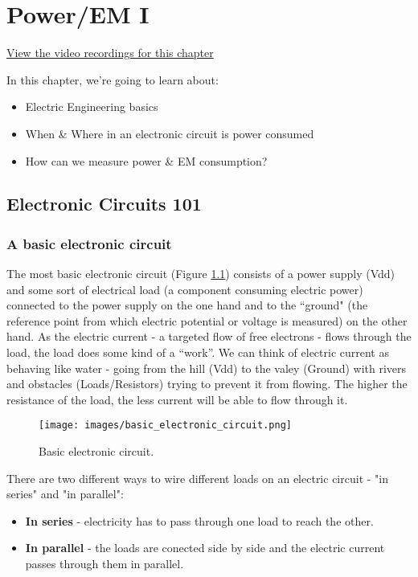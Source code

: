 \chapter{Power/EM I} \label{chap:c4_PowerEM1}

\href{https://orenlab.sise.bgu.ac.il/AttacksonImplementationsCourseBook/#lecture-4---power-em-side-channels-i}{View the video recordings for this chapter}

In this chapter, we're going to learn about:
\begin{itemize}
    \item Electric Engineering basics
    \item When \& Where in an electronic circuit is power consumed
    \item How can we measure power \& EM consumption?
\end{itemize}

\section{Electronic Circuits 101}

\subsection{A basic electronic circuit}

The most basic electronic circuit (Figure \ref{fig:basic_electronic_circuitn}) consists of a power supply (Vdd)
and some sort of electrical load (a component consuming electric power)
connected to the power supply on the one hand and to the ``ground" (the reference point from which electric potential or voltage is measured) on the other hand. As the electric current - a targeted flow of free electrons -
flows through the load, the load does some kind of a ``work''. We can think of electric
current as behaving like water - going from the hill (Vdd) to the valey (Ground) with rivers and obstacles (Loads/Resistors) trying to prevent it from flowing. The higher the resistance of the load, the less current will be able to flow through it.

\begin{figure}[!ht]
	\centering
	\texttt{[image: images/basic\_electronic\_circuit.png]}
	\caption{Basic electronic circuit.} \label{fig:basic_electronic_circuitn}
\end{figure}


There are two different ways to wire different loads on an electric circuit - "in series" and "in parallel":
\begin{itemize}
    \item \textbf{In series} - electricity has to pass through one load to reach the other.
    \item \textbf{In parallel} - the loads are conected side by side and the electric current passes through them in parallel.
\end{itemize}

